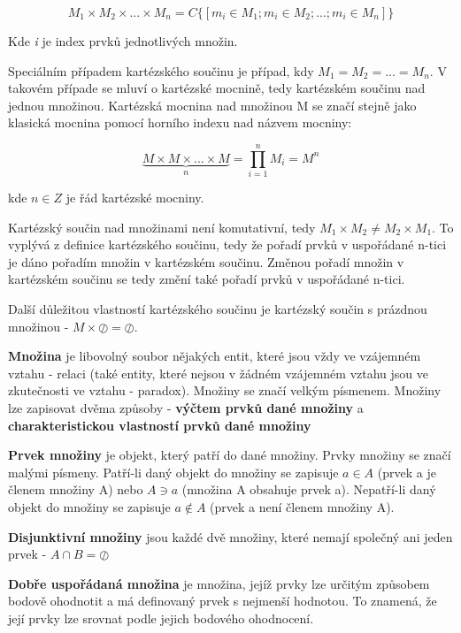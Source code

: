 $$ M_1 \times M_2 \times ... \times M_n = C\{[m_{i} \in M_1; m_{i}\in M_2 ;... ; m_{i} \in M_n] \} $$

Kde {\it i} je index prvků jednotlivých množin. 

Speciálním případem kartézského součinu je případ, kdy $M_1 = M_2 = ... = M_n$. V takovém případe se mluví o kartézské mocnině, tedy kartézském součinu nad jednou množinou. Kartézská mocnina nad množinou M se značí stejně jako klasická mocnina pomocí horního indexu nad názvem mocniny:

$$\underbrace{M \times M \times ... \times M}_n  =\prod^{n}_{i=1} M_i=  M^n $$

kde $n \in Z$ je řád kartézské mocniny.


Kartézský součin nad množinami není komutativní, tedy $M_1 \times M_2 \neq M_2 \times M_1$. To vyplývá z definice kartézského součinu, tedy že pořadí prvků v uspořádané n-tici je dáno pořadím množin v kartézském součinu. Změnou pořadí množin v kartézském součinu se tedy změní také pořadí prvků v uspořádané n-tici.

Další důležitou vlastností kartézského součinu je kartézský součin s prázdnou množinou - $M \times \oslash = \oslash$.






{\bf Množina} je libovolný soubor nějakých entit, které jsou vždy ve vzájemném vztahu - relaci (také entity, které nejsou v žádném vzájemném vztahu jsou ve zkutečnosti ve vztahu - paradox). Množiny se značí velkým písmenem. Množiny lze zapisovat dvěma způsoby - {\bf výčtem prvků dané množiny} a {\bf charakteristickou vlastností prvků dané množiny}

{\bf Prvek množiny} je objekt, který patří do dané množiny. Prvky množiny se značí malými písmeny. Patří-li daný objekt do množiny se zapisuje $a \in A$ (prvek a je členem množiny A) nebo $A \ni a$ (množina A obsahuje prvek a). Nepatří-li daný objekt do množiny se zapisuje $a \notin A$ (prvek a není členem množiny A).

{\bf Disjunktivní množiny} jsou každé dvě množiny, které nemají společný ani jeden prvek - $A \cap B = \oslash$

{\bf Dobře uspořádaná množina} je množina, jejíž prvky lze určitým způsobem bodově ohodnotit a má definovaný prvek s nejmenší hodnotou. To znamená, že její prvky lze srovnat podle jejich bodového ohodnocení.

